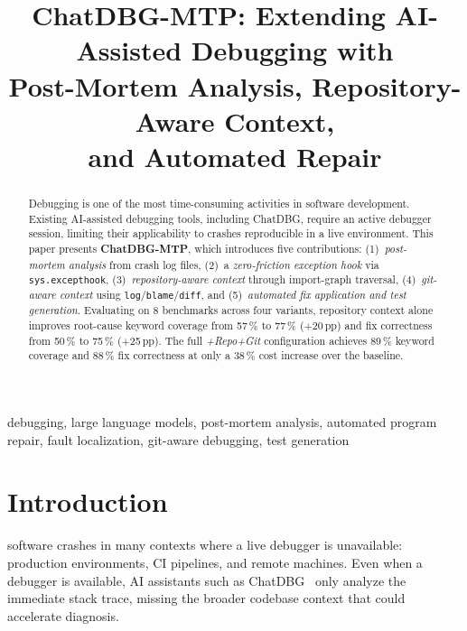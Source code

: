 \documentclass[conference]{IEEEtran}
\begin{document}
\title{ChatDBG-MTP: Extending AI-Assisted Debugging with\\
Post-Mortem Analysis, Repository-Aware Context,\\
and Automated Repair}

\author{
}

\maketitle

\begin{abstract}
Debugging is one of the most time-consuming activities in software development.
Existing AI-assisted debugging tools, including ChatDBG, require an active
debugger session, limiting their applicability to crashes reproducible in a live
environment. This paper presents \textbf{ChatDBG-MTP}, which introduces five
contributions: (1)~\emph{post-mortem analysis} from crash log files,
(2)~a \emph{zero-friction exception hook} via \texttt{sys.excepthook},
(3)~\emph{repository-aware context} through import-graph traversal,
(4)~\emph{git-aware context} using \texttt{log}/\texttt{blame}/\texttt{diff},
and (5)~\emph{automated fix application and test generation}.
Evaluating on 8 benchmarks across four variants, repository context alone
improves root-cause keyword coverage from 57\,\% to 77\,\% (+20\,pp) and fix
correctness from 50\,\% to 75\,\% (+25\,pp). The full \emph{+Repo+Git}
configuration achieves 89\,\% keyword coverage and 88\,\% fix correctness at
only a 38\,\% cost increase over the baseline.
\end{abstract}

\begin{IEEEkeywords}
debugging, large language models, post-mortem analysis, automated program repair,
fault localization, git-aware debugging, test generation
\end{IEEEkeywords}

\section{Introduction}
 software crashes in many contexts where a live debugger
is unavailable: production environments, CI pipelines, and remote machines.
Even when a debugger is available, AI assistants such as
ChatDBG~\cite{chatdbg} only analyze the immediate stack trace, missing the
broader codebase context that could accelerate diagnosis.
\end{document}
